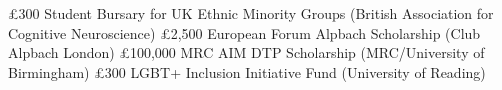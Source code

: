 {%
	£300}
{%
	Student Bursary for UK Ethnic Minority Groups  (British Association for Cognitive Neuroscience)}
{}
\vspace{0.2em}
\datedsubsectionnarrow{}
{%
	£2,500}
{%
	European Forum Alpbach Scholarship  (Club Alpbach London)}
{}
\vspace{0.2em}
{%
	£100,000}
{%
	MRC AIM DTP Scholarship (MRC/University of Birmingham)}
{}
\vspace{0.2em}
\datedsubsectionnarrow{}
{%
	£300}
{%
	LGBT+ Inclusion Initiative Fund (University of Reading)}
{}
